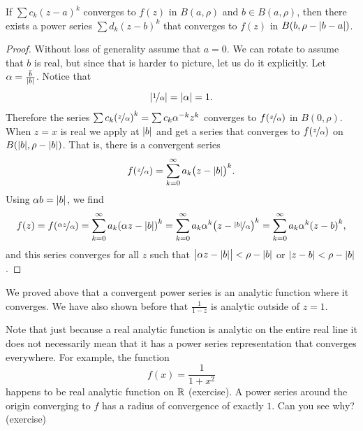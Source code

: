 \begin{cor}
If $\sum c_k {(z-a)}^k$ converges to $f(z)$ in $B(a,\rho)$ and $b \in
B(a,\rho)$,
then there exists a power series
$\sum d_k {(z-b)}^k$ that converges to $f(z)$ in $B(b,\rho-\lvert {b-a} \rvert)$.
\end{cor}

\begin{proof}
Without loss of generality assume that $a=0$.  We can rotate to assume that $b$ is real, but
since that is harder to picture, let us do it explicitly.
Let $\alpha = \frac{\bar{b}}{\lvert {b} \rvert}$.
Notice that
\begin{equation*}
\left\lvert {\nicefrac{1}{\alpha}} \right\rvert = \lvert {\alpha} \rvert
= 1 .
\end{equation*}
Therefore the series
$\sum c_k {(\nicefrac{z}{\alpha})}^k = 
\sum c_k \alpha^{-k} {z}^k$
converges to $f(\nicefrac{z}{\alpha})$ in $B(0,\rho)$.
When $z=x$ is real
we apply  at $\lvert {b} \rvert$ and get
a series that converges
to $f(\nicefrac{z}{\alpha})$ on $B(\lvert {b} \rvert,\rho-\lvert {b} \rvert)$.
That is, there is a convergent series
\begin{equation*}
f(\nicefrac{z}{\alpha}) =
\sum_{k=0}^\infty a_k {\bigl(z - \lvert {b} \rvert\bigr)}^k .
\end{equation*}
Using $\alpha b = \lvert {b} \rvert$, we find
\begin{equation*}
f(z) = f(\nicefrac{\alpha z}{\alpha}) =
\sum_{k=0}^\infty a_k {(\alpha z - \lvert {b} \rvert)}^k 
=
\sum_{k=0}^\infty a_k\alpha^k {\bigl(z - \nicefrac{\lvert {b} \rvert}{\alpha}\bigr)}^k
=
\sum_{k=0}^\infty a_k\alpha^k {(z - b)}^k ,
\end{equation*}
and this series converges for all $z$ such that
$\bigl\lvert \alpha z-\lvert {b} \rvert\bigr\rvert < \rho-\lvert {b} \rvert$
or $\lvert {z - b} \rvert < \rho-\lvert {b} \rvert$.
\end{proof}

We proved above that a convergent power series is an
analytic function where it converges.  We have also shown before that
$\frac{1}{1-z}$ is analytic outside of $z=1$.

Note that just because a real analytic function is analytic on the
entire real line it does not necessarily mean that it has a power series
representation that converges everywhere.  For example, the function
\begin{equation*}
f(x) = \frac{1}{1+x^2}
\end{equation*}
happens to be real analytic function on ${\mathbb{R}}$ (exercise).  A power
series around the origin converging to $f$
has a radius of convergence of exactly $1$.
Can you see why? (exercise)

